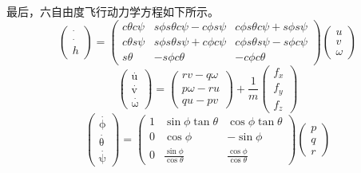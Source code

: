 最后，六自由度飞行动力学方程如下所示。
\begin{equation}
\left( \begin{array}{c}
\mathop {{p_n}}\limits^ \cdot  \\
\mathop {{p_e}}\limits^ \cdot  \\
h
\end{array} \right) = \left( {\begin{array}{*{20}{c}}
{c\theta c\psi }&{s\phi s\theta c\psi  - c\phi s\psi }&{c\phi s\theta c\psi  + s\phi s\psi }\\
{c\theta s\psi }&{s\phi s\theta s\psi  + c\phi c\psi }&{c\phi s\theta s\psi  - s\phi c\psi }\\
{s\theta }&{ - s\phi c\theta }&{ - c\phi c\theta }
\end{array}} \right)\left( \begin{array}{l}
u\\
v\\
\omega
\end{array} \right)
\end{equation}
\begin{equation}
\left( \begin{array}{l}
\mathop u\limits^ \cdot  \\
\mathop v\limits^ \cdot  \\
\mathop \omega \limits^ \cdot
\end{array} \right) = \left( \begin{array}{l}
rv - q\omega \\
p\omega  - ru\\
qu - pv
\end{array} \right) + \frac{1}{m}\left( \begin{array}{l}
{f_x}\\
{f_y}\\
{f_z}
\end{array} \right)
\end{equation}
\begin{equation}
\left( \begin{array}{l}
\mathop \phi \limits^ \cdot  \\
\mathop \theta \limits^ \cdot  \\
\mathop \psi \limits^ \cdot
\end{array} \right) = \left( {\begin{array}{*{20}{c}}
1&{\sin \phi \tan \theta }&{\cos \phi \tan \theta }\\
0&{\cos \phi }&{ - \sin \phi }\\
0&{\frac{{\sin \phi }}{{\cos \theta }}}&{\frac{{\cos \phi }}{{\cos \theta }}}
\end{array}} \right)\left( \begin{array}{l}
p\\
q\\
r
\end{array} \right)
\end{equation}
